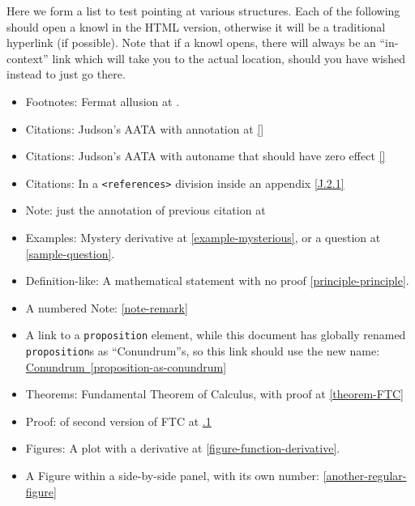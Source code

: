 \documentclass{sn-jnl}
\theoremstyle{thmstyleone}%
\theoremstyle{thmstyletwo}%
\theoremstyle{thmstylethree}%
\newcommand{\xreffont}{\relax}
\newcommand{\mono}[1]{\texttt{#1}}
\numberwithin{equation}{section}
\begin{document}
Here we form a list to test pointing at various structures.  Each of the following should open a knowl in the HTML version, otherwise it will be a traditional hyperlink (if possible).  Note that if a knowl opens, there will always be an ``in-context'' link which will take you to the actual location, should you have  wished instead to just go there.%
\begin{itemize}[label=\textbullet]
\item{}Footnotes: Fermat allusion at \hyperref[footnote-fermat]{{\xreffont 2.1}}.%
\item{}Citations: Judson's AATA with annotation at \hyperlink{biblio-judson-AATA}{[{\xreffont 1}]}%
\item{}Citations: Judson's AATA with autoname that should have zero effect \hyperlink{biblio-judson-AATA}{[{\xreffont 1}]}%
\item{}Citations: In a \mono{<references>} division inside an appendix \hyperlink{biblio-strang-article-uno}{[{\xreffont J.2.1}]}%
\item{}Note: just the annotation of previous citation at \hyperlink{note-judson-AATA}{{\xreffont 1.1}}%
\item{}Examples: Mystery derivative at \hyperref[example-mysterious]{{\xreffont\ref{example-mysterious}}}, or a question at \hyperref[sample-question]{{\xreffont\ref{sample-question}}}.%
\item{}Definition-like: A mathematical statement with no proof \hyperref[principle-principle]{{\xreffont\ref{principle-principle}}}.%
\item{}A numbered Note: \hyperref[note-remark]{{\xreffont\ref{note-remark}}}%
\item{}A link to a \mono{proposition} element, while this document has globally renamed \mono{proposition}s as ``Conundrum''s, so this link should use the new name: \hyperref[proposition-as-conundrum]{Conundrum~{\xreffont\ref{proposition-as-conundrum}}}%
\item{}Theorems: Fundamental Theorem of Calculus, with proof at \hyperref[theorem-FTC]{{\xreffont\ref{theorem-FTC}}}%
\item{}Proof: of second version of FTC at \hyperlink{proof-FTC-corollary}{{\xreffont 4.1.1}}%
\item{}Figures: A plot with a derivative at \hyperref[figure-function-derivative]{{\xreffont\ref{figure-function-derivative}}}.%
\item{}A Figure within a side-by-side panel, with its own number: \hyperref[another-regular-figure]{{\xreffont\ref{another-regular-figure}}}%

\end{itemize}
\end{document}
